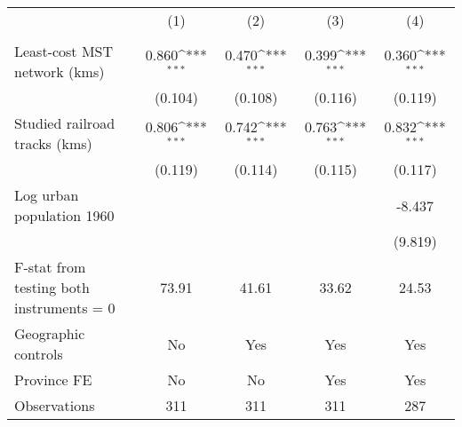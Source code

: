 {
\def\sym#1{\ifmmode^{#1}\else\(^{#1}\)\fi}
\begin{tabular}{l*{4}{c}}
\hline\hline
                &\multicolumn{1}{c}{(1)}&\multicolumn{1}{c}{(2)}&\multicolumn{1}{c}{(3)}&\multicolumn{1}{c}{(4)}\\
                &\multicolumn{1}{c}{}&\multicolumn{1}{c}{}&\multicolumn{1}{c}{}&\multicolumn{1}{c}{}\\
\hline
Least-cost MST network (kms)&    0.860\sym{***}&    0.470\sym{***}&    0.399\sym{***}&    0.360\sym{***}\\
                &  (0.104)         &  (0.108)         &  (0.116)         &  (0.119)         \\
[1em]
Studied railroad tracks (kms)&    0.806\sym{***}&    0.742\sym{***}&    0.763\sym{***}&    0.832\sym{***}\\
                &  (0.119)         &  (0.114)         &  (0.115)         &  (0.117)         \\
[1em]
Log urban population 1960&                  &                  &                  &   -8.437         \\
                &                  &                  &                  &  (9.819)         \\
\hline
F-stat from testing both instruments = 0&    73.91         &    41.61         &    33.62         &    24.53         \\
Geographic controls&       No         &      Yes         &      Yes         &      Yes         \\
Province FE     &       No         &       No         &      Yes         &      Yes         \\
Observations    &      311         &      311         &      311         &      287         \\
\hline\hline
\end{tabular}
}
